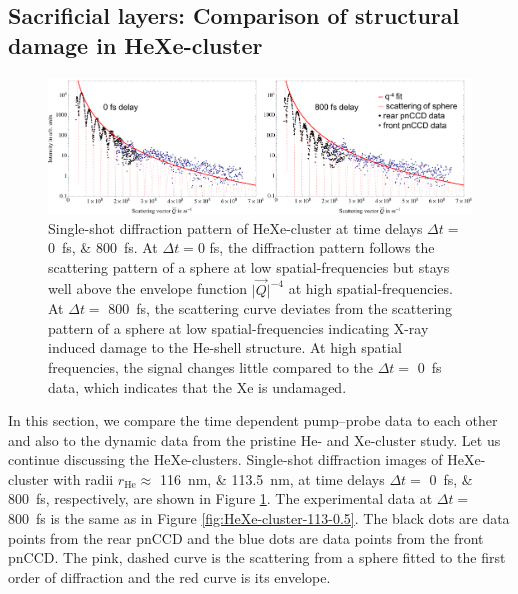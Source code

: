 \subsection{Sacrificial layers: Comparison of structural damage in HeXe-cluster}\label{sec:comparison-of-He-and-HeXe-clusters}
%
\begin{figure}
	\centering
		\includegraphics[width=1.00\textwidth]{images/results/HeXe-comparison-0-800-fs.png}
	\caption[Single-shot diffraction patterns of HeXe-cluster at different time delays]{Single-shot diffraction pattern of HeXe-cluster at time delays $\Delta t =$ 
	\SIlist{0;800}{\femto\second}. At $\Delta t=0$ fs, the diffraction pattern follows the scattering pattern of a sphere at low spatial-frequencies but stays well above the envelope function $\lvert\vec{Q}\rvert^{-4}$ at high spatial-frequencies. At $\Delta t=$ \SI{800}{\femto\second}, the scattering curve deviates from the scattering pattern of a sphere at low spatial-frequencies indicating X-ray induced damage to the He-shell structure. At high spatial frequencies, the signal changes little compared to the $\Delta t=$ \SI{0}{\femto\second} data, which indicates that the Xe is undamaged.
	}
	\label{fig:HeXe-comparison-0-800-fs}
\end{figure}
%
In this section, we compare the time dependent pump--probe data to each other and also to the dynamic data from the pristine He- and Xe-cluster study. Let us continue discussing the HeXe-clusters. Single-shot diffraction images of HeXe-cluster with radii $r_{\text{He}}\approx$ \SIlist{116;113.5}{\nano\meter}, at time delays $\Delta t =$ \SIlist{0;800}{\femto\second}, respectively, are shown in Figure \ref{fig:HeXe-comparison-0-800-fs}. The experimental data at $\Delta t =$ \SI{800}{\femto\second} is the same as in Figure \ref{fig:HeXe-cluster-113-0.5}. The black dots are data points from the rear pnCCD and the blue dots are data points from the front pnCCD. The pink, dashed curve is the scattering from a sphere fitted to the first order of diffraction and the red curve is its envelope. 
